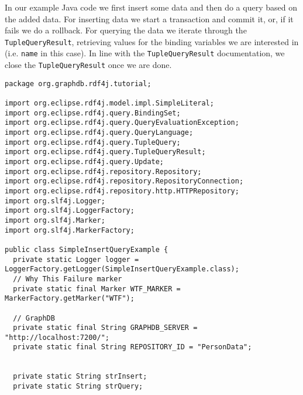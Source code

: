 \documentclass{amsart}
\begin{document}
In our example Java code we first insert some data and then do a query based on the added data. For inserting data we start a transaction and commit it, or, if it fails we do a rollback. For querying the data we iterate through the \texttt{TupleQueryResult}, retrieving values for the binding variables we are interested in (i.e. \texttt{name} in this case). In line with the \texttt{TupleQueryResult} documentation, we close the \texttt{TupleQueryResult} once we are done.

\begin{small}
\begin{verbatim} 
package org.graphdb.rdf4j.tutorial;

import org.eclipse.rdf4j.model.impl.SimpleLiteral;
import org.eclipse.rdf4j.query.BindingSet;
import org.eclipse.rdf4j.query.QueryEvaluationException;
import org.eclipse.rdf4j.query.QueryLanguage;
import org.eclipse.rdf4j.query.TupleQuery;
import org.eclipse.rdf4j.query.TupleQueryResult;
import org.eclipse.rdf4j.query.Update;
import org.eclipse.rdf4j.repository.Repository;
import org.eclipse.rdf4j.repository.RepositoryConnection;
import org.eclipse.rdf4j.repository.http.HTTPRepository;
import org.slf4j.Logger;
import org.slf4j.LoggerFactory;
import org.slf4j.Marker;
import org.slf4j.MarkerFactory;

public class SimpleInsertQueryExample {
  private static Logger logger = LoggerFactory.getLogger(SimpleInsertQueryExample.class);
  // Why This Failure marker
  private static final Marker WTF_MARKER = MarkerFactory.getMarker("WTF");
  
  // GraphDB 
  private static final String GRAPHDB_SERVER = "http://localhost:7200/";
  private static final String REPOSITORY_ID = "PersonData";


  private static String strInsert;
  private static String strQuery;
  

\end{verbatim}
\end{small}
\end{document}
